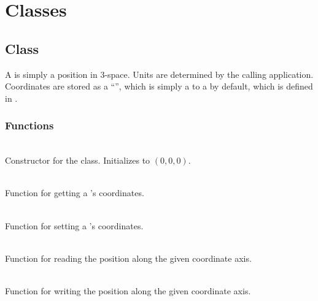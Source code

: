 \documentclass[11pt]{article}
\begin{document}
\section{Classes} \label{s:amrsolve}


\subsection{ Class} \label{ss:point}

   A  is simply a position in $3$-space.  Units are
   determined by the calling application.  Coordinates are stored as a
   ``'', which is simply a  to a
    by default, which is defined in .

   \umlPoint

\subsubsection{ Functions}

     \\
    Constructor for the  class.  Initializes to $(0,0,0)$.

     \\
    Function for getting a 's coordinates.

     \\
    Function for setting a 's coordinates.

     \\ Function for reading
    the  position along the given coordinate axis.

     \\ Function for
    writing the  position along the given coordinate
    axis.
\end{document}
